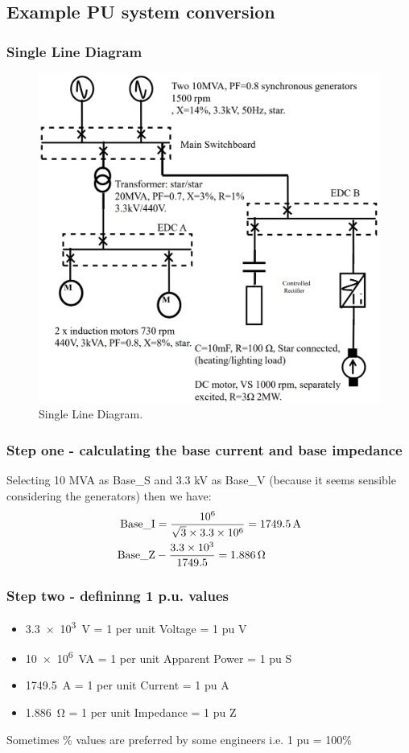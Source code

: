 \documentclass[class=report, crop=false, 12pt,a4paper]{standalone}
\begin{document}
\subsection{Example PU system conversion}
\subsubsection{Single Line Diagram}
\begin{figure}[H]
	\centering
	\includegraphics[width = \textwidth]{../img/figure12.png}
	\caption{Single Line Diagram.}
\end{figure}
\subsubsection{Step one - calculating the base current and base impedance}
Selecting 10 MVA as Base\_S and 3.3 kV as Base\_V (because it seems sensible considering the generators) then we have:
\begin{align}
	\textrm{Base\_I} &= \dfrac{10 \time 10^6}{\sqrt{3}\times 3.3 \times 10^6} = \SI{1749.5}{\ampere}\\
	\textrm{Base\_Z} &- \dfrac{3.3\times 10^3}{1749.5} = \SI{1.886}{\ohm}
\end{align}
\subsubsection{Step two - defininng 1 p.u. values}
\begin{itemize}
	\item \SI{3.3e3}{\volt} = 1 per unit Voltage = 1 pu V
	\item \SI{10e6}{VA} = 1 per unit Apparent Power = 1 pu S
	\item \SI{1749.5}{\ampere} = 1 per unit Current = 1 pu A
	\item \SI{1.886}{\ohm} = 1 per unit Impedance = 1 pu Z
\end{itemize}
Sometimes \% values are preferred by some engineers i.e. 1 pu = 100\%
\end{document}
